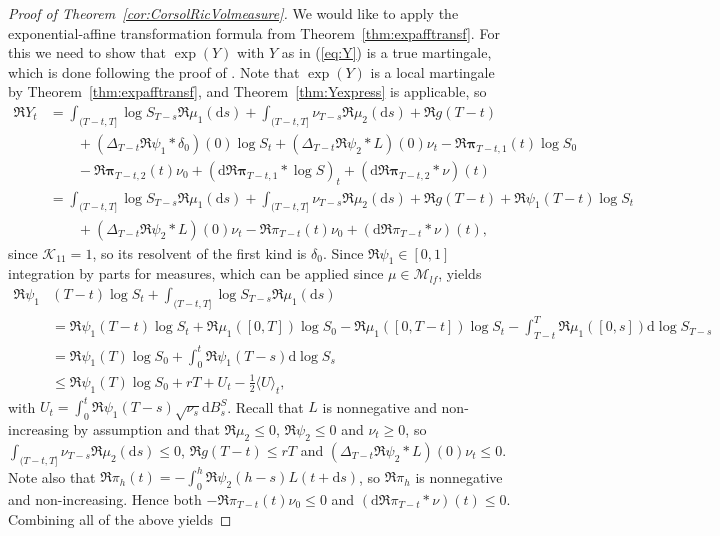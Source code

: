 \documentclass[10pt,a4paper,reqno]{amsart}
\theoremstyle{plain}
\theoremstyle{definition}
\theoremstyle{remark}
\theoremstyle{example}
\begin{document}
\begin{proof}[Proof of Theorem~\ref{cor:CorsolRicVolmeasure}]
    We would like to apply the exponential-affine transformation formula from Theorem~\ref{thm:expafftransf}. For this we need to show that $\exp(Y)$ with $Y$ as in (\ref{eq:Y}) is a true martingale, which is done following the proof of \cite[Thm. 7.1]{abi2019affine}. Note that $\exp(Y)$ is a local martingale by Theorem~\ref{thm:expafftransf}, and Theorem~\ref{thm:Yexpress} is applicable, so
    \begin{align*}
        \Re Y_t &= \int_{(T-t,T]}\log S_{T-s}\Re\mu_1(\mathrm{d} s) + \int_{(T-t,T]}\nu_{T-s}\Re\mu_2(\mathrm{d} s) + \Re g(T-t) 
        \\ &\qquad + (\Delta_{T-t}\Re\psi_1\ast\delta_0)(0)\log S_t + (\Delta_{T-t}\Re\psi_2\ast L)(0)\nu_t - \Re\bm\pi_{T-t,1}(t)\log S_0 \\
        &\qquad - \Re\bm\pi_{T-t,2}(t)\nu_0 + (\mathrm{d}\Re\bm\pi_{T-t,1}\ast\log S)_t + (\mathrm{d}\Re\bm\pi_{T-t,2}\ast\nu)(t) \\
        &= \int_{(T - t,T]}\log S_{T - s}\Re\mu_1(\mathrm{d} s) + \int_{(T - t,T]}\nu_{T - s}\Re\mu_2(\mathrm{d} s) + \Re g(T - t) + \Re\psi_1(T - t)\log S_t \\
        &\qquad + (\Delta_{T-t}\Re\psi_2\ast L)(0)\nu_t - \Re\pi_{T-t}(t)\nu_0 + (\mathrm{d}\Re\pi_{T-t}\ast\nu)(t),
    \end{align*}
    since $\bm{\mathcal{K}}_{11} =1$, so its resolvent of the first kind is $\delta_0$. Since $\Re\psi_1\in[0,1]$ integration by parts for measures, which can be applied since $\mu\in\mathcal{M}_{lf}$, yields
    \begin{align*}
        \Re\psi_1&(T-t)\log S_t + \int_{(T-t,T]}\log S_{T-s}\Re\mu_1(\mathrm{d} s) \\
        &= \Re\psi_1(T-t)\log S_t + \Re\mu_1([0,T])\log S_0 - \Re\mu_1([0,T-t])\log S_t - \int_{T-t}^T\Re\mu_1([0,s])\mathrm{d}\log S_{T-s} \\
        &= \Re\psi_1(T)\log S_0 + \int_{0}^t\Re\psi_1(T-s)\mathrm{d}\log S_s \\
        &\leq \Re\psi_1(T)\log S_0 + r T + U_t - \frac{1}{2}\langle U\rangle_t,
    \end{align*}
    with $U_t = \int_0^t\Re\psi_1(T-s)\sqrt{\nu_s}\mathrm{d} B^S_s$. Recall that $L$ is nonnegative and non-increasing by assumption and that $\Re\mu_2\leq0$, $\Re\psi_2\leq0$ and $\nu_t\geq0$, so $\int_{(T-t,T]}\nu_{T-s}\Re\mu_2(\mathrm{d} s)\leq0$, $\Re g(T-t)\leq rT$ and $(\Delta_{T-t}\Re\psi_2\ast L)(0)\nu_t\leq0$. Note also that $\Re\pi_{h}(t) = -\int_0^h\Re\psi_2(h-s)L(t+\mathrm{d} s)$, so $\Re\pi_{h}$ is nonnegative and non-increasing. Hence both $-\Re\pi_{T-t}(t)\nu_0\leq0$ and $(\mathrm{d}\Re\pi_{T-t}\ast\nu)(t)\leq0$. Combining all of the above yields

\end{proof}
\end{document}
